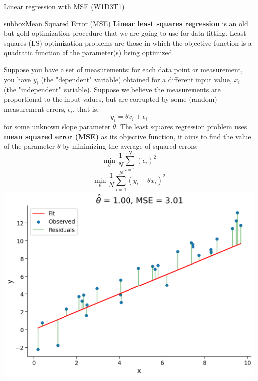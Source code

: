 \begin{textbox}{\href{https://compneuro.neuromatch.io/tutorials/W1D3_ModelFitting/chapter_title.html}{Linear regression with MSE (W1D3T1)}}
\begin{subbox}{subbox}{Mean Squared Error (MSE)}
\scriptsize
\textbf{Linear least squares regression} is an old but gold  optimization procedure that we are going to use for data fitting. Least squares (LS) optimization problems are those in which the objective function is a quadratic function of the
parameter(s) being optimized.

Suppose you have a set of measurements: for each data point or measurement, you have $y_{i}$ (the "dependent" variable) obtained for a different input value, $x_{i}$ (the "independent" variable).  Suppose we believe the measurements are proportional to the input values, but are corrupted by some (random) measurement errors, $\epsilon_{i}$, that is:
\begin{equation}
y_{i}= \theta x_{i}+\epsilon_{i}
\end{equation}
for some unknown slope parameter $\theta.$ The least squares regression problem uses \textbf{mean squared error (MSE)} as its objective function, it aims to find the value of the parameter $\theta$ by minimizing the average of squared errors:
\begin{equation}
\min _{\theta} \frac{1}{N}\sum_{i=1}^{N}\left(\epsilon_{i}\right)^{2}
\end{equation}
\begin{equation}
\min _{\theta} \frac{1}{N}\sum_{i=1}^{N}\left(y_{i}-\theta x_{i}\right)^{2}
\end{equation}
\centering
\includegraphics[scale=0.15]{Figures/ModelFitting/MFFigure1.png}

\end{subbox}
\end{textbox}

